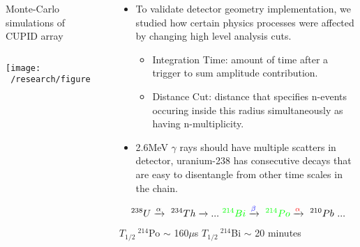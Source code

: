 \documentclass[final]{beamer}
\newlength{\sepwidth}
\newlength{\colwidth}
\newcommand{\separatorcolumn}{\begin{column}{\sepwidth}\end{column}}
\begin{document}
\begin{frame}[t]
\begin{columns}[t]
\begin{column}{\colwidth}
\begin{block}{Monte-Carlo simulations of CUPID array}
\begin{columns}[c]
      \column{.5\colwidth} %
      \texttt{[image: ~/research/figures/DNP2021/muon\_veto.png]}

      
    \end{columns}


  \end{block}

  

\end{column}

\separatorcolumn

\begin{column}{\colwidth}
      

      \begin{itemize}
      \item To validate detector geometry implementation, we studied how certain physics processes were affected by changing high level analysis cuts.
      \begin{itemize}
      \item[\textcolor{blue}{\textbullet}] Integration Time: amount of time after a trigger to sum amplitude contribution.
      \item[\textcolor{blue}{\textbullet}] Distance Cut: distance that specifies  n-events occuring inside this radius simultaneously as having n-multiplicity.
      \end{itemize}
      \item 2.6MeV $\gamma$ rays should have multiple scatters in detector, uranium-238 has consecutive decays that are easy to disentangle from other time scales in the chain.
      \end{itemize}
      \begin{eqnarray*}
        ^{238}U \xrightarrow{\alpha} \  ^{234}Th \xrightarrow \  ... \ \textcolor{green}{^{214}Bi} \xrightarrow{\textcolor{blue}{\beta}} \  \textcolor{green}{^{214}Po} \xrightarrow{\textcolor{red}{\alpha}} \ ^{210}Pb \ ...
      \end{eqnarray*}
      $T_{1/2} \ ^{214}$Po $\sim$ 160$\mu$s \hspace{2cm} $T_{1/2} \ ^{214}$Bi $\sim$ 20 minutes
    
      \begin{columns}[c] %
      

\end{columns}
\end{column}
\end{columns}
\end{frame}
\end{document}
